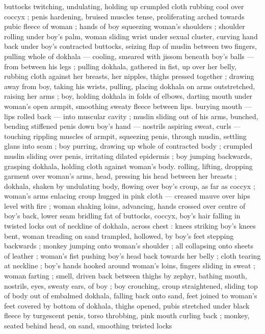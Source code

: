buttocks twitching, undulating, holding up crumpled cloth rubbing 
cool over coccyx ; penis hardening, bruised muscles tense, 
proliferating arched towards pubic fleece of woman ; hands of boy 
squeezing woman's shoulders ; shoulder rolling under boy's palm, 
woman sliding wrist under sexual cluster, curving hand back under 
boy's contracted buttocks, seizing flap of muslin between two 
fingers, pulling whole of dokhala --- cooling, smeared with jissom 
beneath boy's balls --- from between his legs ; pulling dokhala, 
gathered in fist, up over her belly, rubbing cloth against her breasts, 
her nipples, thighs pressed together ; drawing away from boy, taking 
his wrists, pulling, placing dokhala on arms outstretched, raising her 
arms ; boy, holding dokhala in folds of elbows, darting mouth under 
woman's open armpit, smoothing sweaty fleece between lips. 
burying mouth --- lips rolled back --- into muscular cavity ; muslin 
sliding out of his arms, bunched, bending stiffened penis down boy's 
hand --- nostrils aspiring sweat, curls --- touching rippling muscles 
of armpit, squeezing penis, through muslin, settling glans into seam 
; boy purring, drawing up whole of contracted body ; crumpled 
muslin sliding over penis, irritating dilated epidermis ; boy jumping 
backwards, grasping dokhala, holding cloth against woman's body. 
rolling, lifting, dropping garment over woman's arms, head, pressing 
his head between her breasts ; dokhala, shaken by undulating body, 
flowing over boy's croup, as far as coccyx ; woman's arms enlacing 
croup hugged in pink cloth --- creased mauve over hips level with fire 
; woman shaking loins, advancing, hands crossed over centre of 
boy's back, lower seam bridling fat of buttocks, coccyx, boy's hair 
falling in twisted locks out of neckline of dokhala, across chest : 
knees striking boy's knees bent, woman treading on sand trampled, 
hollowed, by boy's feet stepping backwards ; monkey jumping onto 
woman's shoulder ; all collapsing onto sheets of leather ; woman's 
fist pushing boy's head back towards her belly ; cloth tearing at 
neckline ; boy's hands hooked around woman's loins, fingers sliding 
in sweat ; woman farting ; smell, driven back between thighs by 
zephyr, bathing mouth, nostrils, eyes, sweaty ears, of boy ; boy 
crouching, croup straightened, sliding top of body out of embalmed 
dokhala, falling back onto sand, feet joined to woman's feet covered 
by bottom of dokhala, thighs opened, pubis stretched under black 
fleece by turgescent penis, torso throbbing, pink mouth curling back 
; monkey, seated behind head, on sand, smoothing twisted locks 

